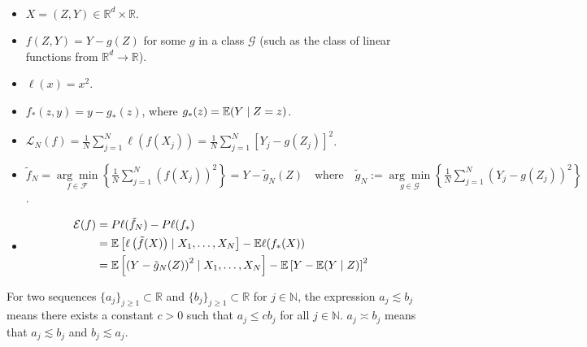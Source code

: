 \begin{example}[Regression] \

\begin{itemize}

\item \(X = (Z, Y) \in \mathbb{R}^d \times \mathbb{R}\).

\item \(f(Z, Y) = Y - g(Z)\) for some \(g\) in a class \(\mathcal{G}\) (such as the class of linear functions from \(\mathbb{R}^d \to \mathbb{R}\)).

\item \(\ell(x) = x^2\).

\item \(f_*(z, y) = y - g_*(z)\), where \(g_*(z) = \mathbb{E}(Y \mid Z = z)\).

\item \(\mathcal{L}_N(f)  =  \frac{1}{N} \sum_{j=1}^N \ell(f(X_j)) = \frac{1}{N} \sum_{j=1}^N [Y_j - g(Z_j)]^2 \).

\item \(\tilde{f}_N  =  \underset{f \in \mathcal{F}}{\arg \min} \left\{ \frac{1}{N} \sum_{j=1}^N (f(X_j))^2 \right\} =  Y - \tilde{g}_N(Z) \quad \text{where} \quad \tilde{g}_N := \underset{g \in \mathcal{G}}{\arg \min} \left\{ \frac{1}{N} \sum_{j=1}^N (Y_j - g(Z_j))^2 \right\} \).

\item 

\begin{align*}
\mathcal{E}(f) & = P \ell(\tilde{f}_N) - P\ell(f_*) 
\\ & =  \mathbb{E} \left[ \ell \left(\tilde{f}(X) \right) \mid X_1, \ldots, X_N \right] - \mathbb{E} \ell(f_*(X))
\\ & =  \mathbb{E} \left[ \left( Y - \tilde{g}_N(Z) \right)^2 \mid X_1, \ldots, X_N \right] - \mathbb{E} \left[ Y -  \mathbb{E}(Y \mid Z ) \right]^2
\end{align*}

\end{itemize}

\end{example}

\begin{definition}

For two sequences \(\{a_j\}_{j \geq 1} \subset \mathbb{R}\) and \(\{b_j\}_{j \geq 1} \subset \mathbb{R}\) for \(j \in \mathbb{N}\), the expression \(a_j \lesssim b_j\) means there exists a constant \(c > 0\) such that \(a_j \leq c b_j\) for all \(j \in \mathbb{N}\). \(a_j \asymp b_j\) means that \(a_j \lesssim b_j\) and \(b_j \lesssim a_j\). 


\end{definition}

